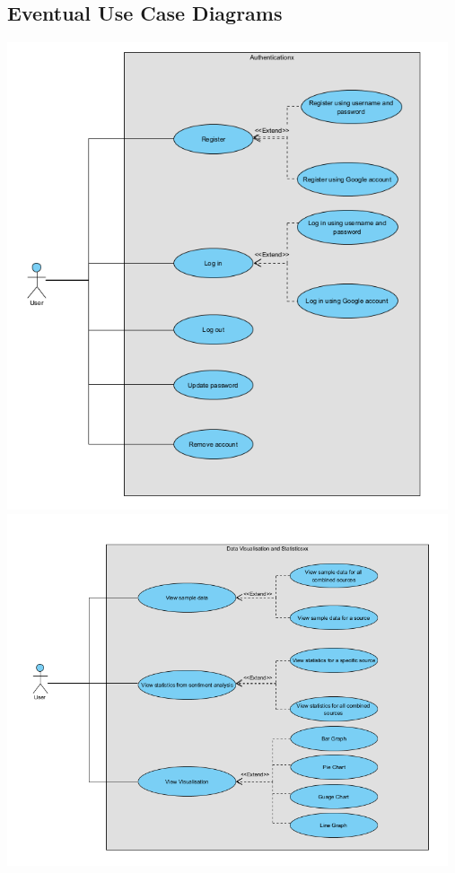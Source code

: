\documentclass[12pt]{article}
\begin{document}
\subsection{Eventual Use Case Diagrams}
\begin{center}
  \includegraphics[width=13cm]{../../Images/UC 2.1.png}
  \includegraphics[width=13cm]{../../Images/UC 2.2.png}

\end{center}
\end{document}
